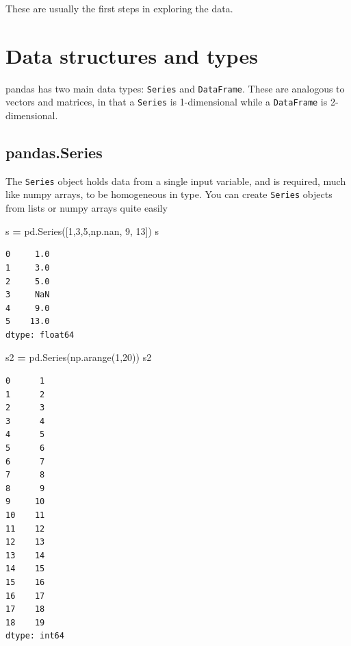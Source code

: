 \documentclass[
  letterpaper,
]{scrbook}
\newenvironment{Shaded}{\begin{snugshade}}{\end{snugshade}}
\newcommand{\DecValTok}[1]{\textcolor[rgb]{0.00,0.00,0.81}{#1}}
\newcommand{\NormalTok}[1]{#1}
\newcommand{\OperatorTok}[1]{\textcolor[rgb]{0.81,0.36,0.00}{\textbf{#1}}}
\begin{document}
These are usually the first steps in exploring the data.

\hypertarget{data-structures-and-types}{%
\section{Data structures and types}\label{data-structures-and-types}}

pandas has two main data types: \texttt{Series} and \texttt{DataFrame}. These are analogous to vectors and matrices, in that a \texttt{Series} is 1-dimensional while a \texttt{DataFrame} is 2-dimensional.

\hypertarget{pandas.series}{%
\subsection{pandas.Series}\label{pandas.series}}

The \texttt{Series} object holds data from a single input variable, and is required, much like numpy arrays, to be homogeneous in type. You can create \texttt{Series} objects from lists or numpy arrays quite easily

\begin{Shaded}
\begin{Highlighting}[]
\NormalTok{s }\OperatorTok{=}\NormalTok{ pd.Series([}\DecValTok{1}\NormalTok{,}\DecValTok{3}\NormalTok{,}\DecValTok{5}\NormalTok{,np.nan, }\DecValTok{9}\NormalTok{, }\DecValTok{13}\NormalTok{])}
\NormalTok{s}
\end{Highlighting}
\end{Shaded}

\begin{verbatim}
0     1.0
1     3.0
2     5.0
3     NaN
4     9.0
5    13.0
dtype: float64
\end{verbatim}

\begin{Shaded}
\begin{Highlighting}[]
\NormalTok{s2 }\OperatorTok{=}\NormalTok{ pd.Series(np.arange(}\DecValTok{1}\NormalTok{,}\DecValTok{20}\NormalTok{))}
\NormalTok{s2}
\end{Highlighting}
\end{Shaded}

\begin{verbatim}
0      1
1      2
2      3
3      4
4      5
5      6
6      7
7      8
8      9
9     10
10    11
11    12
12    13
13    14
14    15
15    16
16    17
17    18
18    19
dtype: int64
\end{verbatim}
\end{document}
